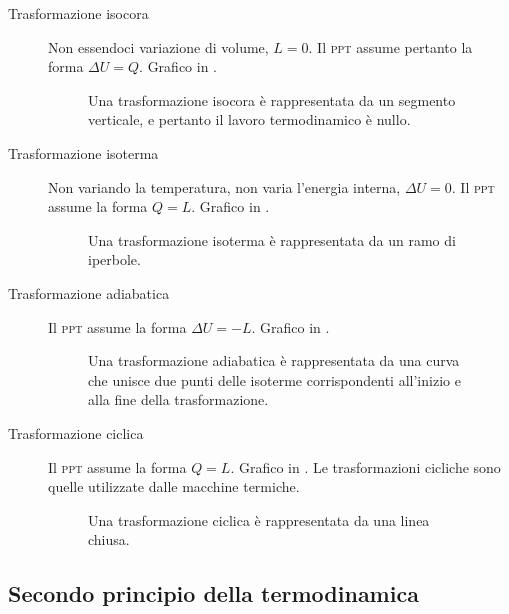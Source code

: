 \documentclass[a4paper,11pt,italian]{article}
\begin{document}
\begin{description}
  \item[Trasformazione isocora] 
  Non essendoci variazione di volume, $ L = 0 $. Il \textsc{ppt} assume pertanto la forma $ \Delta U = Q $. Grafico in .

\begin{figure}[htp]\centering

\caption{Una trasformazione isocora è rappresentata da un segmento verticale, e pertanto il lavoro termodinamico è nullo.}
\label{img:isocora}
\end{figure}

  \item[Trasformazione isoterma] 
  Non variando la temperatura, non varia l'energia interna, $ \Delta U = 0 $. Il \textsc{ppt} assume la forma $ Q = L $. Grafico in . %
 

\begin{figure}[htp]\centering

\caption{Una trasformazione isoterma è rappresentata da un ramo di iperbole.}
\label{img:isoterma}
\end{figure}

  \item[Trasformazione adiabatica] 
  Il \textsc{ppt} assume la forma $ \Delta U = - L $. Grafico in .

\begin{figure}[htp]\centering

\caption{Una trasformazione adiabatica è rappresentata da una curva che unisce due punti delle isoterme corrispondenti all'inizio e alla fine della trasformazione.}
\label{img:adiabatica}
\end{figure}

  \item[Trasformazione ciclica] 
  Il \textsc{ppt} assume la forma  $ Q = L $. Grafico in . Le trasformazioni cicliche sono quelle utilizzate dalle macchine termiche.

\begin{figure}[htp]\centering

\caption{Una trasformazione ciclica è rappresentata da una linea chiusa.}
\label{img:ciclica}
\end{figure}
\end{description}

\subsection{Secondo principio della termodinamica}
\end{document}
